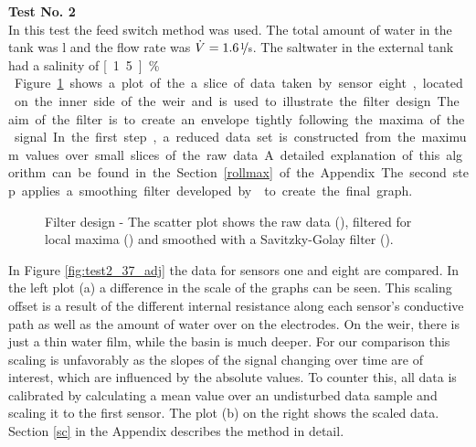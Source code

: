 \textbf{Test No. 2}\\

In this test the feed switch method was used. The total amount of water in the tank was \unit[65]{l} and the flow rate was $\dot{V} =  \unitfrac[1.6]{l}{s}$. The saltwater in the external tank had a salinity of \unit[1.5]{\%}.\\

Figure \ref{fig:test2_7_scatter} shows a plot of the a slice of data taken by sensor eight, located on the inner side of the weir and is used to illustrate the filter design. The aim of the filter is to create an envelope tightly following the maxima of the signal. In the first step, a reduced data set is constructed from the maximum values over small slices of the raw data. A detailed explanation of this algorithm can be found in the Section \ref{rollmax} of the Appendix. The second step applies a smoothing filter developed by \textcite{savitzky1964smoothing} to create the final graph.

\begin{figure}[H]
	\begin{center}
		
		\caption[Filter design]{Filter design - The scatter plot shows the raw data (\drawline[cyan]), filtered for local maxima () and smoothed with a Savitzky-Golay filter (\drawline[red]).}
		\label{fig:test2_7_scatter}
	\end{center}
\end{figure}

In Figure \ref{fig:test2_37_adj} the data for sensors one and eight are compared. In the left plot (a) a difference in the scale of the graphs can be seen. This scaling offset is a result of the different internal resistance along each sensor's conductive path as well as the amount of  water over on the electrodes. On the weir, there is just a thin water film, while the basin is much deeper. For our comparison this scaling is unfavorably as the slopes of the signal changing over time are of interest, which are influenced by the absolute values. To counter this, all data is calibrated by calculating a mean value over an undisturbed data sample and scaling it to the first sensor. The plot (b) on the right shows the scaled data. Section \ref{sc} in the Appendix describes the method in detail.

